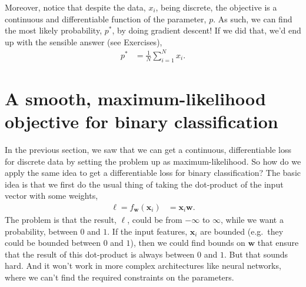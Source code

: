 \documentclass{article}
\newcommand{\x}{\mathbf{x}}
\newcommand{\w}{\mathbf{w}}
\newcommand{\logits}{\ell}
\begin{document}
Moreover, notice that despite the data, $x_i$, being discrete, the objective is a continuous and differentiable function of the parameter, $p$. 
As such, we can find the most likely probability, $p^*$, by doing gradient descent!
If we did that, we'd end up with the sensible answer (see Exercises),
\begin{align}
  p^* &= \tfrac{1}{N} \sum_{i=1}^N x_i.
\end{align}


\section{A smooth, maximum-likelihood objective for binary classification}
\label{sec:binary_obj}
In the previous section, we saw that we can get a continuous, differentiable loss for discrete data by setting the problem up as maximum-likelihood.
So how do we apply the same idea to get a differentiable loss for binary classification?
The basic idea is that we first do the usual thing of taking the dot-product of the input vector with some weights,
\begin{align}
  \logits = f_\w(\x_i) &= \x_i \w.
\end{align}
The problem is that the result, $\logits$, could be from $-\infty$ to $\infty$, while we want a probability, between $0$ and $1$.
If the input features, $\x_i$ are bounded (e.g.\ they could be bounded between $0$ and $1$), then we could find bounds on $\w$ that ensure that the result of this dot-product is always between $0$ and $1$.
But that sounds hard.
And it won't work in more complex architectures like neural networks, where we can't find the required constraints on the parameters.
\end{document}
